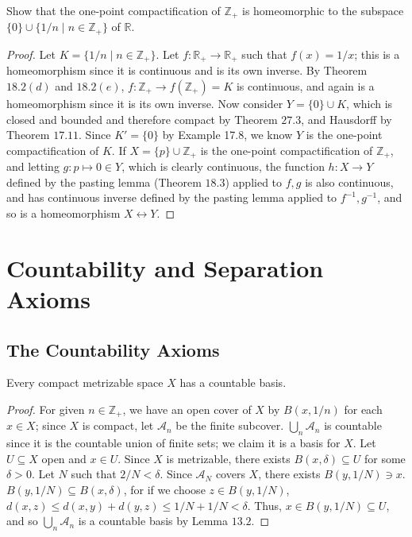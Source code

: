 \documentclass[12pt]{article}
\theoremstyle{remark}
\begin{document}
\setcounter{subsubsection}{7}
\begin{problem}
  Show that the one-point compactification of $\mathbb{Z}_+$ is homeomorphic to the subspace $\{0\} \cup \{1/n \mid n \in \mathbb{Z}_+\}$ of $\mathbb{R}$.
\end{problem}
\begin{proof}
  Let $K = \{1/n \mid n \in \mathbb{Z}_+\}$. Let $f\colon \mathbb{R}_+ \to
  \mathbb{R}_+$ such that $f(x) = 1/x$; this is a homeomorphism since it is
  continuous and is its own inverse. By Theorem $18.2(d)$ and $18.2(e)$,
  $f\colon \mathbb{Z}_+ \to f(\mathbb{Z}_+) = K$ is continuous, and again is a
  homeomorphism since it is its own inverse. Now consider $Y = \{0\} \cup K$,
  which is closed and bounded and therefore compact by Theorem $27.3$, and
  Hausdorff by Theorem $17.11$. Since $K' = \{0\}$ by Example 17.8, we know
  $Y$ is the one-point compactification of $K$. If $X = \{p\} \cup \mathbb{Z}_+$
  is the one-point compactification of $\mathbb{Z}_+$, and letting $g\colon p
  \mapsto 0 \in Y$, which is clearly continuous, the function $h\colon X \to Y$ defined by the pasting lemma (Theorem $18.3$) applied to $f,g$ is also continuous, and has continuous inverse defined by the pasting lemma applied to $f^{-1},g^{-1}$, and so is a homeomorphism $X \leftrightarrow Y$.
\end{proof}

\section{Countability and Separation Axioms}
\setcounter{subsection}{29}
\subsection{The Countability Axioms}
\setcounter{subsubsection}{3}
\begin{problem}\label{exc:30.4}
  Every compact metrizable space $X$ has a countable basis.
\end{problem}
\begin{proof}
  For given $n \in \mathbb{Z}_+$, we have an open cover of $X$ by $B(x,1/n)$ for each $x \in X$; since $X$ is compact, let $\mathcal{A}_n$ be the finite subcover. $\bigcup_n \mathcal{A}_n$ is countable since it is the countable union of finite sets; we claim it is a basis for $X$. Let $U \subseteq X$ open and $x \in U$. Since $X$ is metrizable, there exists $B(x,\delta) \subseteq U$ for some $\delta > 0$. Let $N$ such that $2/N < \delta$. Since $\mathcal{A}_N$ covers $X$, there exists $B(y,1/N) \ni x$. $B(y,1/N) \subseteq B(x,\delta)$, for if we choose $z \in B(y,1/N)$, $d(x,z) \le d(x,y)+d(y,z) \le 1/N+1/N < \delta$. Thus, $x \in B(y,1/N) \subseteq U$, and so $\bigcup_n \mathcal{A}_n$ is a countable basis by Lemma $13.2$.
\end{proof}
\end{document}
